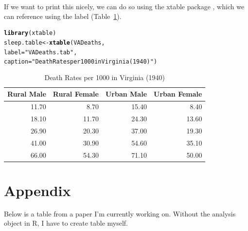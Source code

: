 \documentclass{article}\usepackage[]{graphicx}\usepackage[]{xcolor}
\makeatletter
\newcommand{\hlsng}[1]{\textcolor[rgb]{0.192,0.494,0.8}{#1}}%
\newcommand{\hldef}[1]{\textcolor[rgb]{0.345,0.345,0.345}{#1}}%
\newcommand{\hlkwb}[1]{\textcolor[rgb]{0.69,0.353,0.396}{#1}}%
\newcommand{\hlkwc}[1]{\textcolor[rgb]{0.333,0.667,0.333}{#1}}%
\newcommand{\hlkwd}[1]{\textcolor[rgb]{0.737,0.353,0.396}{\textbf{#1}}}%
\newenvironment{kframe}{%
 \def\at@end@of@kframe{}%
 \ifinner\ifhmode%
  \def\at@end@of@kframe{\end{minipage}}%
  \begin{minipage}{\columnwidth}%
 \fi\fi%
 \def\FrameCommand##1{\hskip\@totalleftmargin \hskip-\fboxsep
 \colorbox{shadecolor}{##1}\hskip-\fboxsep
     \hskip-\linewidth \hskip-\@totalleftmargin \hskip\columnwidth}%
 \MakeFramed {\advance\hsize-\width
   \@totalleftmargin\z@ \linewidth\hsize
   \@setminipage}}%
 {\par\unskip\endMakeFramed%
 \at@end@of@kframe}
\newenvironment{knitrout}{}{} %
\makeatother
\begin{document}
\begin{multicols}{2}
If we want to print this nicely, we can do so using the xtable package \citep{xtable}, which we can reference using the label (Table~\ref{VADeaths.tab}).

\begin{knitrout}\scriptsize
{}\color{fgcolor}\begin{kframe}
\begin{alltt}
\hlkwd{library}\hldef{(xtable)}
\hldef{sleep.table}\hlkwb{<-}\hlkwd{xtable}\hldef{(VADeaths ,}
                    \hlkwc{label} \hldef{=} \hlsng{"VADeaths.tab"}\hldef{,}
                    \hlkwc{caption} \hldef{=} \hlsng{"Death Rates per 1000 in Virginia (1940)"}\hldef{)}
\end{alltt}
\end{kframe}
\end{knitrout}
\begin{table}[H]
\centering
\begingroup\small
\begin{tabular}{rrrr}
  \hline
Rural Male & Rural Female & Urban Male & Urban Female \\ 
  \hline
11.70 & 8.70 & 15.40 & 8.40 \\ 
  18.10 & 11.70 & 24.30 & 13.60 \\ 
  26.90 & 20.30 & 37.00 & 19.30 \\ 
  41.00 & 30.90 & 54.60 & 35.10 \\ 
  66.00 & 54.30 & 71.10 & 50.00 \\ 
   \hline
\end{tabular}
\endgroup
\caption{Death Rates per 1000 in Virginia (1940)} 
\label{VADeaths.tab}
\end{table}

\vspace{2em}

\begin{tiny}

\end{tiny}
\end{multicols}

\newpage
\onecolumn
\section{Appendix}
Below is a table from a paper I'm currently working on. Without the analysis object in R, I have to create table myself.
\end{document}
